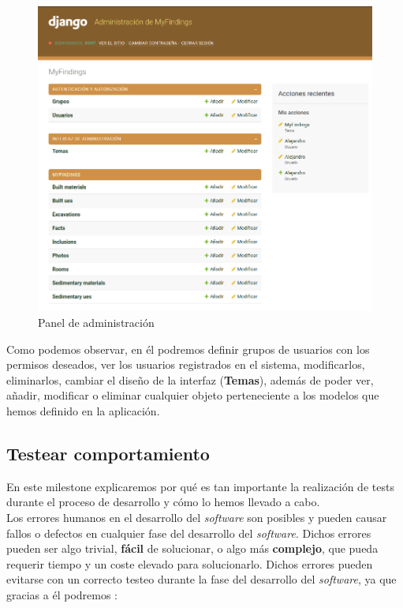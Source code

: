     \begin{figure}[H]
        \centering
        \includegraphics[scale=0.32]{imagenes/admin-interface.png}
        \caption{Panel de administración}
        \label{fig:admin-interface}
    \end{figure}

Como podemos observar, en él podremos definir grupos de usuarios con los permisos deseados,
ver los usuarios registrados en el sistema, modificarlos, eliminarlos, cambiar el diseño
de la interfaz (\textbf{Temas}), además de poder ver, añadir, modificar o eliminar
cualquier objeto perteneciente a los modelos que hemos definido en la aplicación.


\subsection{Testear comportamiento}
En este milestone explicaremos por qué es tan importante la realización de tests durante
el proceso de desarrollo y cómo lo hemos llevado a cabo.\\

Los errores humanos en el desarrollo del \textit{software} son posibles y pueden causar
fallos o defectos en cualquier fase del desarrollo del \textit{software}. Dichos errores
pueden ser algo trivial, \textbf{fácil} de solucionar, o algo más \textbf{complejo}, que
pueda requerir tiempo y un coste elevado para solucionarlo. Dichos errores pueden evitarse
con un correcto testeo durante la fase del desarrollo del \textit{software}, ya que gracias
a él podremos \cite{why-testing}:

